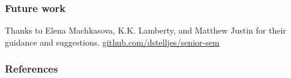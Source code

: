 \documentclass{beamer}
\begin{document}
  \begin{frame}
    \frametitle{Future work}
  \end{frame}

  \begin{frame}[standout]
    \centering
    Thanks to Elena Machkasova, K.K. Lamberty, and Matthew Justin for their guidance and suggestions.
    \vfill
    \href{https://github.com/dstelljes/senior-sem}{github.com/dstelljes/senior-sem}
    \vfill
    \ccbyncsa{}
  \end{frame}

  \appendix{}

  \begin{frame}[allowframebreaks]
    \frametitle{References}

    \printbibliography{}
  \end{frame}
\end{document}
